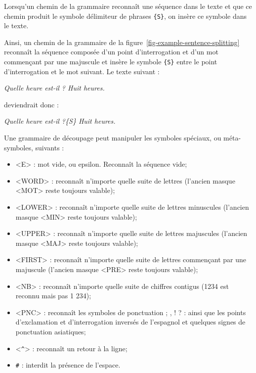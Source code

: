\bigskip
\noindent  Lorsqu’un chemin de la grammaire reconnaît une séquence dans le texte et que ce chemin
produit le symbole délimiteur de phrases \verb+{S}+,
on insère ce symbole dans le texte.

\bigskip
\noindent Ainsi,
un chemin de la grammaire de la figure~\ref{fig-example-sentence-splitting} reconnaît la séquence
composée d’un point d’interrogation et d’un mot commençant par une majuscule et insère le symbole 
\verb+{S}+ entre le point d’interrogation et le mot suivant. Le texte suivant :


\bigskip
\textit{Quelle heure est-il ? Huit heures.}

\bigskip
\noindent deviendrait donc :

\bigskip
\textit{Quelle heure est-il ?\{S\} Huit heures.}

\bigskip
\noindent Une grammaire de découpage peut manipuler les symboles spéciaux, ou méta-symboles, suivants :

\index{\verb+<^>+}\index{\verb+#+}
\begin{itemize}
  \item <E> : mot vide, ou epsilon. Reconnaît la séquence vide;
  \item <WORD> : reconnaît n’importe quelle suite de lettres (l'ancien masque <MOT> reste toujours valable);
  \item <LOWER> : reconnaît n’importe quelle suite de lettres minuscules  (l'ancien masque <MIN> reste toujours valable);
  \item <UPPER> : reconnaît n’importe quelle suite de lettres majuscules  (l'ancien masque <MAJ> reste toujours valable);
  \item <FIRST> : reconnaît n’importe quelle suite de lettres commençant par une majuscule (l'ancien masque <PRE> reste toujours valable);
  \item <NB> : reconnaît n’importe quelle suite de chiffres contigus (1234 est reconnu mais pas 1 234); 
  \item <PNC> : reconnaît les symboles de ponctuation ; , ! ? : ainsi que les points d’exclamation
  	  et d’interrogation inversés de l’espagnol et quelques signes de ponctuation asiatiques;
  \item <\verb+^+> : reconnaît un retour à la ligne;
  \item \verb+#+ : interdit la présence de l’espace.
\end{itemize}

